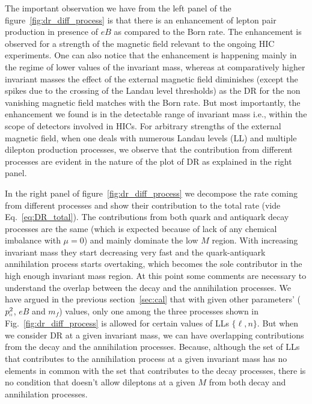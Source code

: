 \documentclass[aps,prd,floatfix,showpacs,showkeys,superscriptadress,unsortedaddress,nofootinbib,onecolumn]{revtex4-1}
\newcommand{\shp}{\shortparallel}
\begin{document}
The important observation we have from the left panel of the figure~\ref{fig:dr_diff_process} is that there is an enhancement of lepton pair production in presence of $eB$ as compared to the Born rate. The enhancement is observed for a strength of the magnetic field relevant to the ongoing HIC experiments. One can also notice that the enhancement is happening mainly in the regime of lower values of the invariant mass, whereas at comparatively higher invariant masses the effect of the external magnetic field diminishes (except the spikes due to the crossing of the Landau level thresholds) as the DR for the non vanishing magnetic field matches with the Born rate. But most importantly, the enhancement we found is in the detectable range of invariant mass i.e., within the scope of detectors involved in HICs. For arbitrary strengths of the external magnetic field, when one deals with numerous Landau levels (LL) and multiple dilepton production processes, we observe that the contribution from different processes are evident in the nature of the plot of DR as explained in the right panel. 

In the right panel of figure~\ref{fig:dr_diff_process} we decompose the rate coming from different processes and show their contribution to the total rate (vide Eq.~\eqref{eq:DR_total}). The contributions from both quark and antiquark decay processes are the same (which is expected because of lack of any chemical imbalance with $\mu=0$) and mainly dominate the low $M$ region. With increasing invariant mass they start decreasing very fast and the quark-antiquark annihilation process starts overtaking, which becomes the sole contributor in the high enough invariant mass region. At this point some comments are necessary to understand the overlap between the decay and the annihilation processes. We have argued in the previous section~\eqref{sec:cal} that with given other parameters' ($p^2_{\shp}$, $eB$ and $m_f$) values, only one among the three processes shown in Fig.~\ref{fig:dr_diff_process} is allowed for certain values of LLs $\{\ell,n\}$. But when we consider DR at a given invariant mass, we can have overlapping contributions from the decay and the annihilation processes. Because, although the set of LLs that contributes to the annihilation process at a given invariant mass has no elements in common with the set that contributes to the decay processes, there is no condition that doesn't allow dileptons at a given $M$ from both decay and annihilation processes.
\end{document}
